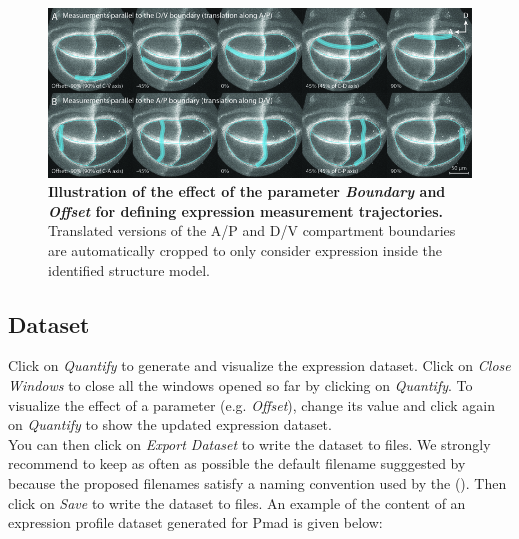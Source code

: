 \begin{figure}[!h]
\centering
\includegraphics[scale=0.52]{images/wingj_expression_profiles_trajectory.jpg}
\caption{\textbf{Illustration of the effect of the parameter \textit{Boundary} and \textit{Offset} for defining expression measurement trajectories.} Translated versions of the A/P and D/V compartment boundaries are automatically cropped to only consider expression inside the identified structure model.}
\label{fig:wingj_expression_profiles_trajectories}
\end{figure}

\subsection{Dataset}\label{sec:expression_profiles_dataset}
Click on \textit{Quantify} to generate and visualize the expression dataset. Click on \textit{Close Windows} to close all the windows opened so far by clicking on \textit{Quantify}. To visualize the effect of a parameter (e.g. \textit{Offset}), change its value and click again on \textit{Quantify} to show the updated expression dataset.\\

You can then click on \textit{Export Dataset} to write the dataset to files. We strongly recommend to keep as often as possible the default filename sugggested by \wingj because the proposed filenames satisfy a naming convention used by the \wingjMatlab (). Then click on \textit{Save} to write the dataset to files. An example of the content of an expression profile dataset generated for Pmad is given below:

